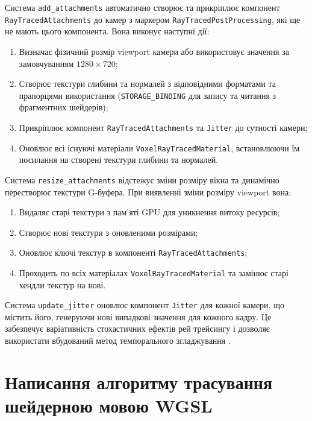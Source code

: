 Система \texttt{add\_attachments} автоматично створює та прикріплює компонент \texttt{RayTracedAttachments} до камер з маркером \texttt{RayTracedPostProcessing}, які ще не мають цього компонента. Вона виконує наступні дії:

\begin{enumerate}[itemsep=0pt, topsep=0pt]
    \item Визначає фізичний розмір viewport камери або використовує значення за замовчуванням $1280 \times 720$;
    \item Створює текстури глибини та нормалей з відповідними форматами та прапорцями використання (\texttt{STORAGE\_BINDING} для запису та читання з фрагментних шейдерів);
    \item Прикріплює компонент \texttt{RayTracedAttachments} та \texttt{Jitter} до сутності камери;
    \item Оновлює всі існуючі матеріали \texttt{VoxelRayTracedMaterial}, встановлюючи їм посилання на створені текстури глибини та нормалей.
\end{enumerate}

Система \texttt{resize\_attachments} відстежує зміни розміру вікна та динамічно перестворює текстури G-буфера. При виявленні зміни розміру viewport вона:

\begin{enumerate}[itemsep=0pt, topsep=0pt]
    \item Видаляє старі текстури з пам'яті GPU для уникнення витоку ресурсів;
    \item Створює нові текстури з оновленими розмірами;
    \item Оновлює ключі текстур в компоненті \texttt{RayTracedAttachments};
    \item Проходить по всіх матеріалах \texttt{VoxelRayTracedMaterial} та замінює старі хендли текстур на нові.
\end{enumerate}

Система \texttt{update\_jitter} оновлює компонент \texttt{Jitter} для кожної камери, що містить його, генеруючи нові випадкові значення для кожного кадру. Це забезпечує варіативність стохастичних ефектів рей трейсингу і дозволяє використати вбудований метод темпорального згладжування .

\section{Написання алгоритму трасування шейдерною мовою WGSL}